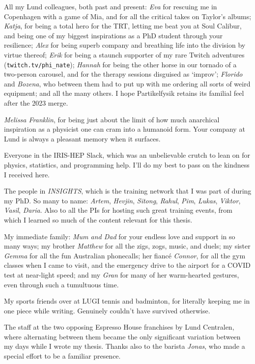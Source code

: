 \documentclass[
  11pt,
  numbers=noendperiod]{book}
\begin{document}
All my Lund colleagues, both past and present: \textit{Eva} for rescuing me in Copenhagen with a game of Mia, and for all the critical takes on Taylor's albums; \textit{Katja}, for being a total hero for the TRT, letting me beat you at Soul Calibur, and being one of my biggest inspirations as a PhD student through your resilience; \textit{Alex} for being superb company and breathing life into the division by virtue thereof; \textit{Erik} for being a staunch supporter of my rare Twitch adventures (\texttt{twitch.tv/phi\_nate}); \textit{Hannah} for being the other horse in our tornado of a two-person carousel, and for the therapy sessions disguised as `improv'; \textit{Florido} and \textit{Bozena}, who between them had to put up with me ordering all sorts of weird equipment; and all the many others. I hope Partikelfysik retains its familial feel after the 2023 merge.

\newpage

\textit{Melissa Franklin}, for being just about the limit of how much anarchical inspiration as a physicist one can cram into a humanoid form. Your company at Lund is always a pleasant memory when it surfaces.

Everyone in the IRIS-HEP Slack, which was an unbelievable crutch to lean on for physics, statistics, and programming help. I'll do my best to pass on the kindness I received here.

The people in \textit{INSIGHTS}, which is the training network that I was part of during my PhD. So many to name: \textit{Artem}, \textit{Hevjin}, \textit{Sitong}, \textit{Rahul}, \textit{Pim}, \textit{Lukas}, \textit{Viktor}, \textit{Vasil}, \textit{Daria}. Also to all the PIs for hosting such great training events, from which I learned so much of the content relevant for this thesis.

My immediate family: \textit{Mum and Dad} for your endless love and support in so many ways; my brother \textit{Matthew} for all the zigs, zogs, music, and duels; my sister \textit{Gemma} for all the fun Australian phonecalls; her fiancé \textit{Connor}, for all the gym classes when I came to visit, and the emergency drive to the airport for a COVID test at near-light speed; and my \textit{Gran} for many of her warm-hearted gestures, even through such a tumultuous time.

My sports friends over at LUGI tennis and badminton, for literally keeping me in one piece while writing. Genuinely couldn't have survived otherwise.

The staff at the two opposing Espresso House franchises by Lund Centralen, where alternating between them became the only significant variation between my days while I wrote my thesis. Thanks also to the barista \textit{Jonas}, who made a special effort to be a familiar presence.
\end{document}
